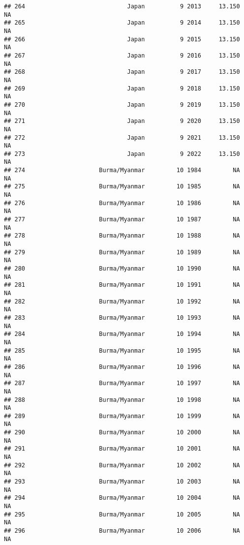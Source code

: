 \documentclass[
]{article}
\begin{document}
\begin{verbatim}
## 264                             Japan          9 2013     13.150         NA
## 265                             Japan          9 2014     13.150         NA
## 266                             Japan          9 2015     13.150         NA
## 267                             Japan          9 2016     13.150         NA
## 268                             Japan          9 2017     13.150         NA
## 269                             Japan          9 2018     13.150         NA
## 270                             Japan          9 2019     13.150         NA
## 271                             Japan          9 2020     13.150         NA
## 272                             Japan          9 2021     13.150         NA
## 273                             Japan          9 2022     13.150         NA
## 274                     Burma/Myanmar         10 1984         NA         NA
## 275                     Burma/Myanmar         10 1985         NA         NA
## 276                     Burma/Myanmar         10 1986         NA         NA
## 277                     Burma/Myanmar         10 1987         NA         NA
## 278                     Burma/Myanmar         10 1988         NA         NA
## 279                     Burma/Myanmar         10 1989         NA         NA
## 280                     Burma/Myanmar         10 1990         NA         NA
## 281                     Burma/Myanmar         10 1991         NA         NA
## 282                     Burma/Myanmar         10 1992         NA         NA
## 283                     Burma/Myanmar         10 1993         NA         NA
## 284                     Burma/Myanmar         10 1994         NA         NA
## 285                     Burma/Myanmar         10 1995         NA         NA
## 286                     Burma/Myanmar         10 1996         NA         NA
## 287                     Burma/Myanmar         10 1997         NA         NA
## 288                     Burma/Myanmar         10 1998         NA         NA
## 289                     Burma/Myanmar         10 1999         NA         NA
## 290                     Burma/Myanmar         10 2000         NA         NA
## 291                     Burma/Myanmar         10 2001         NA         NA
## 292                     Burma/Myanmar         10 2002         NA         NA
## 293                     Burma/Myanmar         10 2003         NA         NA
## 294                     Burma/Myanmar         10 2004         NA         NA
## 295                     Burma/Myanmar         10 2005         NA         NA
## 296                     Burma/Myanmar         10 2006         NA         NA

\end{verbatim}
\end{document}

